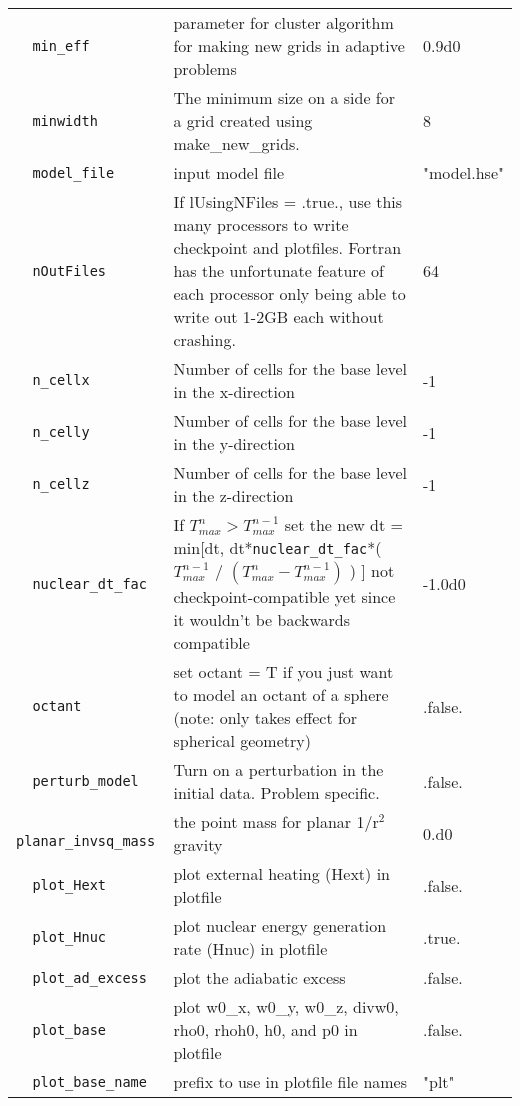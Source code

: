 \begin{landscape}
{\begin{center}
\begin{longtable}{|l|p{5.25in}|l|}
\verb=  min_eff  = &   parameter for cluster algorithm for making new grids in adaptive problems  &  0.9d0 \\
\rowcolor{tableShade}
\verb=  minwidth  = &   The minimum size on a side for a grid created using make\_new\_grids.  &  8 \\
\verb=  model_file  = &   input model file  &  "model.hse" \\
\rowcolor{tableShade}
\verb=  nOutFiles  = &   If lUsingNFiles = .true., use this many processors to write checkpoint and plotfiles.  Fortran has the unfortunate feature of each processor only being able to write out 1-2GB each without crashing.  &  64 \\
\verb=  n_cellx  = &   Number of cells for the base level in the x-direction  &  -1 \\
\rowcolor{tableShade}
\verb=  n_celly  = &   Number of cells for the base level in the y-direction  &  -1 \\
\verb=  n_cellz  = &   Number of cells for the base level in the z-direction  &  -1 \\
\rowcolor{tableShade}
\verb=  nuclear_dt_fac  = &   If $T_{max}^n > T_{max}^{n-1}$ set the new dt =   min[dt, dt*{\tt nuclear\_dt\_fac}*( $T_{max}^{n-1}$ / $(T_{max}^n-T_{max}^{n-1})$ ) ] not checkpoint-compatible yet since it wouldn't be backwards compatible  &  -1.0d0 \\
\verb=  octant  = &   set octant = T if you just want to model an octant of a sphere (note: only takes effect for spherical geometry)  &  .false. \\
\rowcolor{tableShade}
\verb=  perturb_model  = &   Turn on a perturbation in the initial data.  Problem specific.  &  .false. \\
\verb=  planar_invsq_mass  = &   the point mass for planar 1/r$^2$ gravity  &  0.d0 \\
\rowcolor{tableShade}
\verb=  plot_Hext  = &   plot external heating (Hext) in plotfile  &  .false. \\
\verb=  plot_Hnuc  = &   plot nuclear energy generation rate (Hnuc) in plotfile  &  .true. \\
\rowcolor{tableShade}
\verb=  plot_ad_excess  = &   plot the adiabatic excess  &  .false. \\
\verb=  plot_base  = &   plot w0\_x, w0\_y, w0\_z, divw0, rho0, rhoh0, h0, and p0 in plotfile  &  .false. \\
\rowcolor{tableShade}
\verb=  plot_base_name  = &   prefix to use in plotfile file names  &  "plt" \\

\end{longtable}
\end{center}}
\end{landscape}

